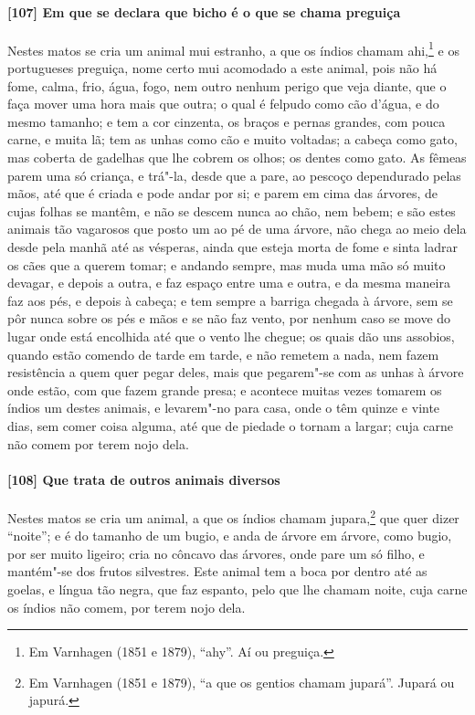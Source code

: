 \begin{linenumbers}
\paragraph{[107] Em que se declara que bicho é o que se chama preguiça}\quad
Nestes matos se cria um animal mui estranho, a que os índios chamam ahi,\footnote{ Em
Varnhagen (1851 e 1879), ``ahy''. Aí ou preguiça.} e os portugueses preguiça, nome certo
mui acomodado a este animal, pois não há fome, calma, frio, água, fogo, nem outro nenhum
perigo que veja diante, que o faça mover uma hora mais que outra; o qual é felpudo como
cão d'água, e do mesmo tamanho; e tem a cor cinzenta, os braços e pernas grandes, com
pouca carne, e muita lã; tem as unhas como cão e muito voltadas; a cabeça como gato, mas
coberta de gadelhas que lhe cobrem os olhos; os dentes como gato. As fêmeas parem uma só
criança, e trá"-la, desde que a pare, ao pescoço dependurado pelas mãos, até que é criada e
pode andar por si; e parem em cima das árvores, de cujas folhas se mantêm, e não se descem
nunca ao chão, nem bebem; e são estes animais tão vagarosos que posto um ao pé de uma
árvore, não chega ao meio dela desde pela manhã até as vésperas, ainda que esteja morta de
fome e sinta ladrar os cães que a querem tomar; e andando sempre, mas muda uma mão só
muito devagar, e depois a outra, e faz espaço entre uma e outra, e da mesma maneira faz
aos pés, e depois à cabeça; e tem sempre a barriga chegada à árvore, sem se pôr nunca
sobre os pés e mãos e se não faz vento, por nenhum caso se move do lugar onde está
encolhida até que o vento lhe chegue; os quais dão uns assobios, quando estão comendo de
tarde em tarde, e não remetem a nada, nem fazem resistência a quem quer pegar deles, mais
que pegarem"-se com as unhas à árvore onde estão, com que fazem grande presa; e acontece
muitas vezes tomarem os índios um destes animais, e levarem"-no para casa, onde o têm
quinze e vinte dias, sem comer coisa alguma, até que de piedade o tornam a largar; cuja
carne não comem por terem nojo dela.

\paragraph{[108] Que trata de outros animais diversos}\quad
Nestes matos se cria um animal, a que os índios chamam jupara,\footnote{ Em Varnhagen
(1851 e 1879), ``a que os gentios chamam jupará''. Jupará ou japurá.} que quer dizer
``noite''; e é do tamanho de um bugio, e anda de árvore em árvore, como bugio, por ser
muito ligeiro; cria no côncavo das árvores, onde pare um só filho, e mantém"-se dos frutos
silvestres. Este animal tem a boca por dentro até as goelas, e língua tão negra, que faz
espanto, pelo que lhe chamam noite, cuja carne os índios não comem, por terem nojo dela.


\end{linenumbers}

